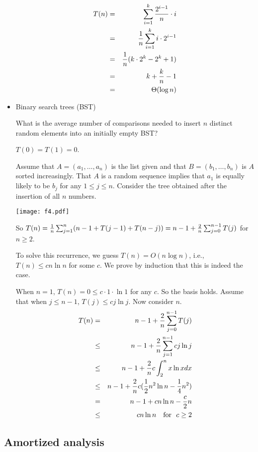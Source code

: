 \documentclass{article}
\begin{document}
\begin{itemize}
\begin{eqnarray*}
T(n)&=&\sum_{i=1}^k {2^{i-1}\over n}\cdot i\\
&=&{1\over n}\sum_{i=1}^k i\cdot 2^{i-1}\\
&=&{1\over n}(k\cdot 2^k-2^k+1)\\
&=&k+{k\over n}-1\\
&=&\Theta(\log n)
\end{eqnarray*}

\item Binary search trees (BST)

What is the average number of comparisons needed to insert $n$
distinct random elements into an initially empty BST?

$T(0)=T(1)=0$.

Assume that $A=(a_1,\ldots,a_n)$ is the list given and that 
$B=(b_1,\ldots,b_n)$ is $A$ sorted increasingly.
That $A$ is a random sequence implies that $a_1$ is equally likely
to be $b_j$ for any $1\le j\le n$. Consider the tree obtained after
the insertion of all $n$ numbers.

\vskip 0.25cm
\begin{center}
\texttt{[image: f4.pdf]}
\end{center}

So $T(n)={1\over n}\sum_{j=1}^n(n-1+T(j-1)+T(n-j))=n-1+{2\over n}
\sum_{j=0}^{n-1}T(j)$ for $n\ge2$.

To solve this recurrence, we guess $T(n)=O(n\log n)$, i.e., 
$T(n)\le cn\ln n$ for some $c$. We prove by induction that
this is indeed the case.

When $n=1$, $T(n)=0\le c\cdot 1\cdot \ln 1$ for any $c$. So the
basis holds. Assume that when $j\le n-1$, $T(j)\le cj\ln j$.
Now consider $n$.
\begin{eqnarray*}
T(n)&=&n-1+{2\over n}\sum_{j=0}^{n-1}T(j)\\
&\le&n-1+{2\over n}\sum_{j=1}^{n-1}cj\ln j\\
&\le&n-1+{2\over n}c\int_2^n x\ln xdx\\
&\le&n-1+{2\over n}c({1\over2}n^2\ln n-{1\over4}n^2)\\
&=&n-1+cn\ln n-{c\over2}n\\
&\le&cn\ln n {\rm \quad for\ \ } c\ge  2
\end{eqnarray*}
\end{itemize}

\newpage
\subsection{Amortized analysis}
\end{document}
